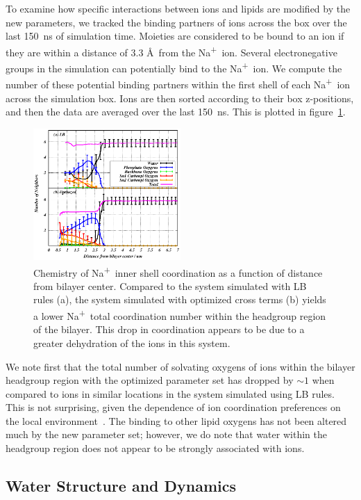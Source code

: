 \documentclass[12pt,openany,final]{book}
\newcommand{\na}{Na\textsuperscript{+}}
\begin{document}
To examine how specific interactions between ions and lipids are modified by the new parameters, 
we tracked the binding partners of ions across the box over the last 150~ns of simulation time. 
Moieties are considered to be bound to an ion if they are within a distance of 3.3 \AA~from the \na~ion. 
Several electronegative groups in the simulation can potentially bind to the \na~ion. 
We compute the number of these potential binding partners within the first shell of each \na~ion
across the simulation box. 
Ions are then sorted according to their box z-positions, and then the data are averaged over the last 150~ns. 
This is plotted in figure~\ref{fig:cood}. 
\begin{figure}[h!]
    \caption[\na inner shell coordination]{
Chemistry of \na~inner shell coordination as a function of distance from bilayer
center. Compared to the system simulated with LB rules (a), the system simulated with optimized cross terms (b)
        yields a lower \na~total coordination number within the headgroup region of the bilayer. 
    This drop in coordination appears to be due to a greater dehydration of the ions in this system.}
    \label{fig:cood}
    \includegraphics[width=0.5\textwidth,trim=-0cm 0 0 0]{figure_5_ch1.eps}
\end{figure}
We note first that the total number of solvating oxygens of ions within the bilayer headgroup
region with the optimized parameter set has dropped by $\sim 1$ when
compared to ions in similar locations in the system simulated using LB rules. 
This is not surprising, given the dependence of ion coordination
preferences on the local environment~\cite{varma:2008:JACS}. 
The binding to other lipid oxygens has not been altered much by the new parameter set; 
however, we do note that water within the headgroup region does not appear to be strongly associated with ions. 

\subsection{Water Structure and Dynamics}
\end{document}
